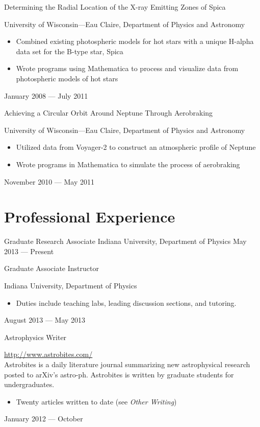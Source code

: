 \documentclass{cv}
\begin{document}
\begin{resume}
\objectLarge
{Determining the Radial Location of the X-ray Emitting}
{Zones of Spica}
{University of Wisconsin---Eau Claire, Department of Physics and Astronomy \noemph
\begin{itemize}
		\item Combined existing photospheric models for hot stars with a unique H-alpha data set for the B-type star, Spica
		\item Wrote programs using Mathematica to process and visualize data from photospheric models of hot stars
	\end{itemize}
 }
{January 2008 --- July 2011}


\objectLarge
{Achieving a Circular Orbit Around Neptune}
{Through Aerobraking}
{University of Wisconsin---Eau Claire, Department of Physics and Astronomy \noemph
\begin{itemize}
		\item Utilized data from Voyager-2 to construct an atmospheric profile of Neptune
		\item Wrote programs in Mathematica to simulate the process of aerobraking
	\end{itemize}
 }
{November 2010 --- May 2011}



\section{Professional Experience}

\object
{Graduate Research Associate}
{Indiana University, Department of Physics \noemph
 }
{May 2013 --- Present}


\object
{Graduate Associate Instructor}
{Indiana University, Department of Physics \noemph
	\begin{itemize}
		\item Duties include teaching labs, leading discussion sections, and tutoring.
	\end{itemize}
 }
{August 2013 --- May 2013}

\object
{Astrophysics Writer}
{\rm \href{http://astrobites.com/}{http://www.astrobites.com/} \noemph \\
Astrobites is a daily literature journal summarizing new astrophysical research posted to arXiv's astro-ph. Astrobites is written by graduate students for 	undergraduates.
	\begin{itemize}
		\item Twenty articles written to date (see \emph{Other Writing})
	\end{itemize}
 }
{January 2012 --- October}



\end{resume}
\end{document}
